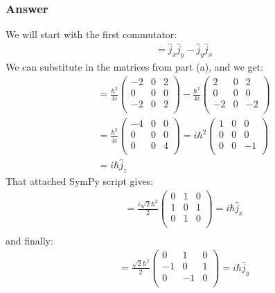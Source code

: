\documentclass{article}
\begin{document}
\subsubsection{Answer}
We will start with the first commutator:
\begin{align}
[\hat{j}_x, \hat{j}_y] &= \hat{j}_x \hat{j}_y - \hat{j}_y \hat{j}_x
\end{align}
We can substitute in the matrices from part (a), and we get:
\begin{align}
[\hat{j}_x, \hat{j}_y] &= \frac{\hbar ^2}{4i} 
\begin{pmatrix}
-2 & 0 & 2 \\
0 & 0 & 0 \\
-2 & 0 & 2 \\
\end{pmatrix}
- \frac{\hbar ^2}{4i}
\begin{pmatrix}
2 & 0 & 2 \\
0 & 0 & 0 \\
-2 & 0 & -2 \\
\end{pmatrix} \\
&= \frac{\hbar ^2}{4i}
\begin{pmatrix}
-4 & 0 & 0 \\
0 & 0 & 0 \\
0 & 0 & 4 \\
\end{pmatrix}
= i \hbar^2
\begin{pmatrix}
1 & 0 & 0 \\
0 & 0 & 0 \\
0 & 0 & -1 \\
\end{pmatrix} \\
&= i \hbar \hat{j}_z
\end{align}
That attached SymPy script gives:
\begin{align}
[\hat{j}_y, \hat{j}_z] &= \frac{i\sqrt{2}\hbar^2}{2} 
\begin{pmatrix}
0 & 1 & 0 \\
1 & 0 & 1 \\
0 & 1 & 0 \\
\end{pmatrix}
= i \hbar \hat{j}_x \\
\end{align}
and finally:
\begin{align}
[\hat{j}_z, \hat{j}_x] &= \frac{\sqrt{2}\hbar^2}{2}
\begin{pmatrix}
0 & 1 & 0 \\
-1 & 0 & 1 \\
0 & -1 & 0 \\
\end{pmatrix}
= i \hbar \hat{j}_y
\end{align}
\end{document}
